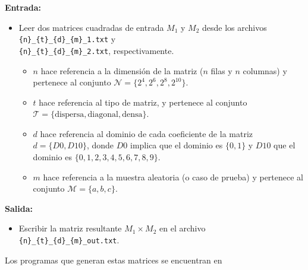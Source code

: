 \textbf{Entrada:}
\begin{itemize}
    \item Leer dos matrices cuadradas de entrada $M_1$ y $M_2$ desde los archivos \texttt{\{n\}\_\{t\}\_\{d\}\_\{m\}\_1.txt} y \\ 
    \texttt{\{n\}\_\{t\}\_\{d\}\_\{m\}\_2.txt}, respectivamente.
    \begin{itemize}
        \item $n$ hace referencia a la dimensión de la matriz ($n$ filas y $n$ columnas) y pertenece al conjunto $\mathcal{N} = \{2^4, 2^6, 2^8, 2^{10}\}$.
        \item $t$ hace referencia al tipo de matriz, y pertenece al conjunto $\mathcal{T} = \{ \text{dispersa}, \text{diagonal}, \text{densa} \}$.
        \item $d$ hace referencia al dominio de cada coeficiente de la matriz $d = \{D0, D10\}$, donde $D0$ implica que el dominio es $\{0,1\}$ y $D10$ que el dominio es $\{0,1,2,3,4,5,6,7,8,9\}$. 
        \item $m$ hace referencia a la muestra aleatoria (o caso de prueba) y pertenece al conjunto $\mathcal{M} = \{a,b,c\}$.
    \end{itemize}
\end{itemize}

\textbf{Salida:}
\begin{itemize}
    \item Escribir la matriz resultante $M_1 \times M_2$ en el archivo \texttt{\{n\}\_\{t\}\_\{d\}\_\{m\}\_out.txt}.
\end{itemize}

\begin{mdframed}
    Los programas que generan estas matrices se encuentran en 

    \begin{center}
    \end{center}
    
    
\end{mdframed}


